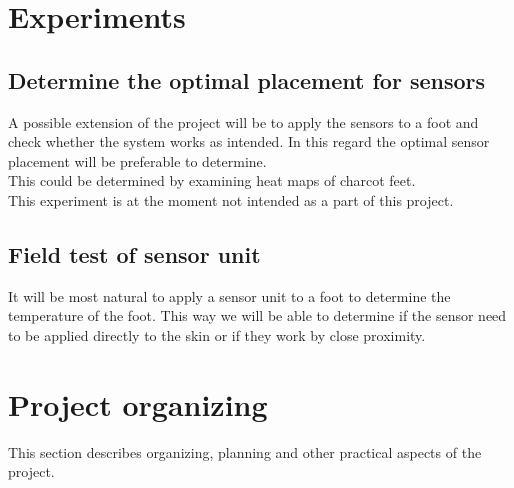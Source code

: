\section{Experiments}
\subsection{Determine the optimal placement for sensors}
A possible extension of the project will be to apply the sensors to a foot and check whether the system works as intended. In this regard the optimal sensor placement will be preferable to determine.\\
This could be determined by examining heat maps of charcot feet.\\
This experiment is at the moment not intended as a part of this project.

\subsection{Field test of sensor unit}
It will be most natural to apply a sensor unit to a foot to determine the temperature of the foot. This way we will be able to determine if the sensor need to be applied directly to the skin or if they work by close proximity. 

\section{Project organizing}
This section describes organizing, planning and other practical aspects of the project.

